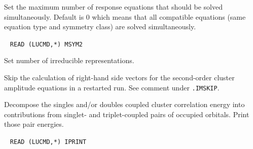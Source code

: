 \begin{description}
  Set the maximum number of response equations that should be 
  solved simultaneously. Default is 0 which means that all
  compatible equations (same equation type and symmetry class) 
  are solved simultaneously.
 
\item[\Key{NSYM}] \verb| |\newline
       \verb|READ (LUCMD,*) MSYM2|

       Set number of irreducible representations. 
 
\item[\Key{O2SKIP}] 
   Skip the calculation of right-hand side vectors for the 
   second-order cluster amplitude equations
   in a restarted run. See comment under \verb|.IMSKIP|.
%
%

%
%
\item[\Key{PAIRS}]
         Decompose the singles and/or doubles coupled cluster correlation energy
         into contributions from singlet- and triplet-coupled
         pairs of occupied orbitals. Print those pair energies.

\item[\Key{PRINT}]  \verb| |\newline
\verb|READ (LUCMD,*) IPRINT|


\end{description}
